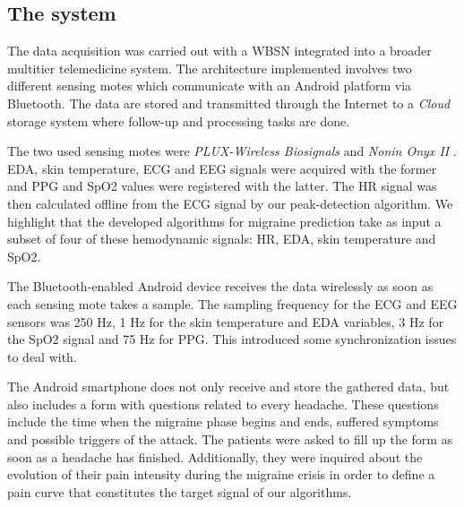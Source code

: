 \subsection{The system}
\label{subsec:thesystem}

The data acquisition was carried out with a WBSN integrated into a
broader multitier telemedicine system. The architecture implemented
involves two different sensing motes which communicate with an Android
platform via Bluetooth. The data are stored and transmitted through the
Internet to a \emph{Cloud} storage system where follow-up and processing tasks are
done.

The two used sensing motes were \emph{PLUX-Wireless Biosignals}
\cite{BIOPLUXws} and \emph{Nonin Onyx II} \cite{NONINws}. EDA, skin
temperature, ECG and EEG signals were acquired with the former and PPG and SpO2 values were registered with the latter. The HR signal was then calculated offline from the
ECG signal by our peak-detection algorithm. We highlight that the developed algorithms for
migraine prediction take as input a subset of four of these hemodynamic signals: HR, EDA, skin temperature and SpO2.

The Bluetooth-enabled Android device receives the data wirelessly as
soon as each sensing mote takes a sample. 
The sampling frequency for the ECG and EEG sensors was 250 Hz,
1 Hz for the skin temperature and EDA variables,
3 Hz for the SpO2 signal and 75 Hz for PPG. 
This introduced some synchronization issues to deal with.

The Android smartphone does not only receive and store the gathered
data, but also includes a form with questions related to every
headache. These questions include the time when the migraine phase
begins and ends, suffered symptoms and possible triggers of the
attack. The patients were asked to fill up the form as soon as a
headache has finished. Additionally, they were inquired about the evolution of their pain intensity during the migraine crisis in order to define a pain curve that constitutes the target signal of our algorithms.
